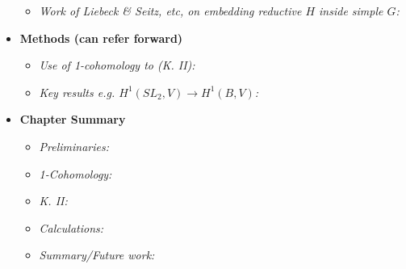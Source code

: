 \begin{itemize}
\begin{itemize}
		\item \emph{Work of Liebeck \& Seitz, etc, on embedding reductive $H$ inside simple $G$:}
		
	\end{itemize}

	\item[] \textbf{Methods (can refer forward)}
	\begin{itemize}
		\item \emph{Use of 1-cohomology to (K. II):}
		\item \emph{Key results e.g. $H^1(SL_2, V)\rightarrow H^1(B, V)$:}
	\end{itemize}
	
	\item[] \textbf{Chapter Summary}
	\begin{itemize}
		\item \emph{Preliminaries:}
		\item \emph{1-Cohomology:}
		\item \emph{K. II:}
		\item \emph{Calculations:}
		\item \emph{Summary/Future work:}
	\end{itemize}
\end{itemize}

